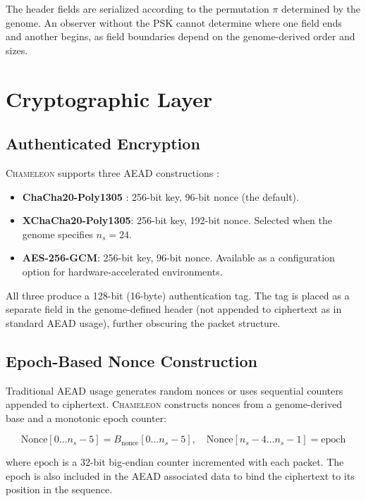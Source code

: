 \documentclass[11pt,a4paper]{article}
\newcommand{\chameleon}{\textsc{Chameleon}}
\begin{document}
The header fields are serialized according to the permutation $\pi$ determined by the genome. An observer without the PSK cannot determine where one field ends and another begins, as field boundaries depend on the genome-derived order and sizes.

\section{Cryptographic Layer}\label{sec:crypto}

\subsection{Authenticated Encryption}

\chameleon{} supports three AEAD constructions \cite{rfc5116}:
\begin{itemize}[nosep]
  \item \textbf{ChaCha20-Poly1305} \cite{rfc8439}: 256-bit key, 96-bit nonce (the default).
  \item \textbf{XChaCha20-Poly1305}: 256-bit key, 192-bit nonce. Selected when the genome specifies $n_s = 24$.
  \item \textbf{AES-256-GCM}: 256-bit key, 96-bit nonce. Available as a configuration option for hardware-accelerated environments.
\end{itemize}

All three produce a 128-bit (16-byte) authentication tag. The tag is placed as a separate field in the genome-defined header (not appended to ciphertext as in standard AEAD usage), further obscuring the packet structure.

\subsection{Epoch-Based Nonce Construction}\label{sec:nonce}

Traditional AEAD usage generates random nonces or uses sequential counters appended to ciphertext. \chameleon{} constructs nonces from a genome-derived base and a monotonic epoch counter:

\begin{equation}\label{eq:nonce}
  \text{Nonce}[0 \ldots n_s{-}5] = B_{\text{nonce}}[0 \ldots n_s{-}5], \quad
  \text{Nonce}[n_s{-}4 \ldots n_s{-}1] = \text{epoch}
\end{equation}

where $\text{epoch}$ is a 32-bit big-endian counter incremented with each packet. The epoch is also included in the AEAD associated data to bind the ciphertext to its position in the sequence.
\end{document}
